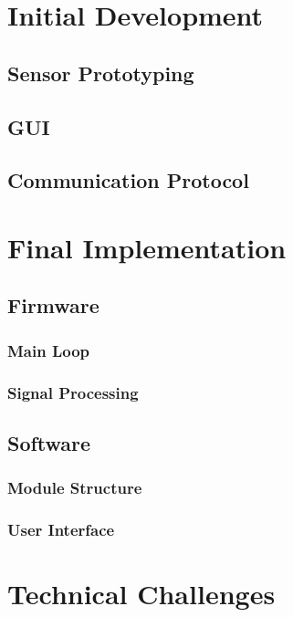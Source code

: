 \documentclass[a4paper,11pt]{article}
\begin{document}
\section{Initial Development}
\label{sec:initial_development}
\subsection{Sensor Prototyping}
\label{sec:sensor_prototyping}
\subsection{GUI}
\label{sec:gui_simulation}
\subsection{Communication Protocol}
\label{sec:comm_protocol}

\section{Final Implementation}
\label{sec:final_implementation}
\subsection{Firmware}
\label{sec:firmware}
\subsubsection{Main Loop}
\label{subsec:main_loop}
\subsubsection{Signal Processing}
\label{subsec:firmware_processing}
\subsection{Software}
\label{sec:software}
\subsubsection{Module Structure}
\label{subsec:software_modules}
\subsubsection{User Interface}
\label{subsec:software_ui}

\section{Technical Challenges}
\label{sec:technical_problems}
\end{document}
